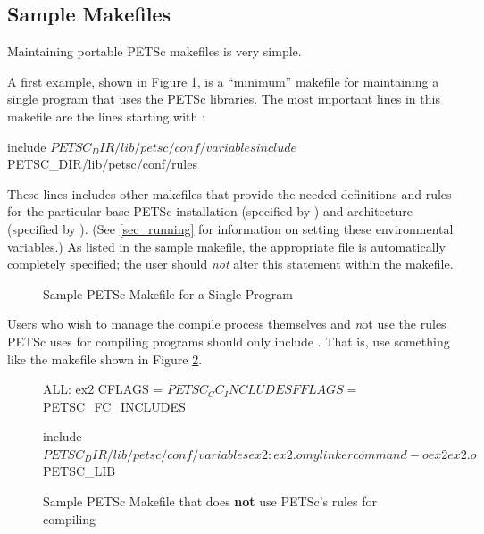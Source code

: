 {{\subsection{Sample Makefiles}

Maintaining portable PETSc makefiles is very simple.

A first example, shown in Figure \ref{fig_make1}, is a ``minimum'' makefile for maintaining
a single program that uses the PETSc libraries.
The most important lines in this makefile are the lines starting with :
\begin{makelisting}
include ${PETSC_DIR}/lib/petsc/conf/variables
include ${PETSC_DIR}/lib/petsc/conf/rules
\end{makelisting}
These lines includes other makefiles that provide the needed definitions
and rules for the particular base PETSc installation (specified by
) and architecture (specified by
).  (See \ref{sec_running} for information on
setting these environmental variables.)  As listed in the sample
makefile, the appropriate  file is automatically
completely specified; the user should {\em not} alter this statement
within the makefile.

\begin{figure}[H]
\caption{Sample PETSc Makefile for a Single Program}
\label{fig_make1}
\end{figure}

Users who wish to manage the compile process themselves
and {\emph not} use the rules PETSc uses for compiling programs
should only include . That is, use something like
the makefile shown in Figure \ref{fig_make1var}.

\begin{figure}[H]
\begin{makelisting}
   ALL: ex2
   CFLAGS   = ${PETSC_CC_INCLUDES}
   FFLAGS   = ${PETSC_FC_INCLUDES}

   include ${PETSC_DIR}/lib/petsc/conf/variables

   ex2: ex2.o
           mylinkercommand -o ex2 ex2.o  ${PETSC_LIB}
\end{makelisting}
\caption{Sample PETSc Makefile that does {\bf not} use PETSc's rules for compiling}
\label{fig_make1var}
\end{figure}

}}
